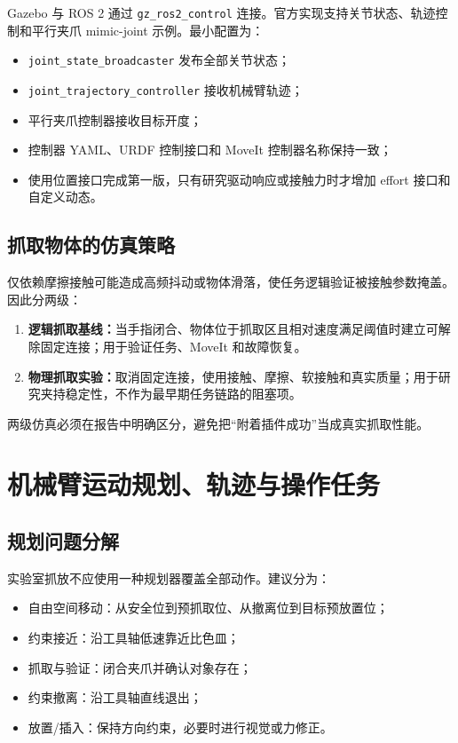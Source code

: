 \documentclass[UTF8,12pt,oneside]{ctexrep}
\begin{document}
Gazebo 与 ROS 2 通过 \texttt{gz\_ros2\_control} 连接。官方实现支持关节状态、轨迹控制和平行夹爪 mimic-joint 示例\cite{gzros2control2026}。最小配置为：

\begin{itemize}
  \item \texttt{joint\_state\_broadcaster} 发布全部关节状态；
  \item \texttt{joint\_trajectory\_controller} 接收机械臂轨迹；
  \item 平行夹爪控制器接收目标开度；
  \item 控制器 YAML、URDF 控制接口和 MoveIt 控制器名称保持一致；
  \item 使用位置接口完成第一版，只有研究驱动响应或接触力时才增加 effort 接口和自定义动态。
\end{itemize}

\section{抓取物体的仿真策略}

仅依赖摩擦接触可能造成高频抖动或物体滑落，使任务逻辑验证被接触参数掩盖。因此分两级：

\begin{enumerate}
  \item \textbf{逻辑抓取基线：}当手指闭合、物体位于抓取区且相对速度满足阈值时建立可解除固定连接；用于验证任务、MoveIt 和故障恢复。
  \item \textbf{物理抓取实验：}取消固定连接，使用接触、摩擦、软接触和真实质量；用于研究夹持稳定性，不作为最早期任务链路的阻塞项。
\end{enumerate}

两级仿真必须在报告中明确区分，避免把“附着插件成功”当成真实抓取性能。

\chapter{机械臂运动规划、轨迹与操作任务}

\section{规划问题分解}

实验室抓放不应使用一种规划器覆盖全部动作。建议分为：

\begin{itemize}
  \item 自由空间移动：从安全位到预抓取位、从撤离位到目标预放置位；
  \item 约束接近：沿工具轴低速靠近比色皿；
  \item 抓取与验证：闭合夹爪并确认对象存在；
  \item 约束撤离：沿工具轴直线退出；
  \item 放置/插入：保持方向约束，必要时进行视觉或力修正。
\end{itemize}
\end{document}
